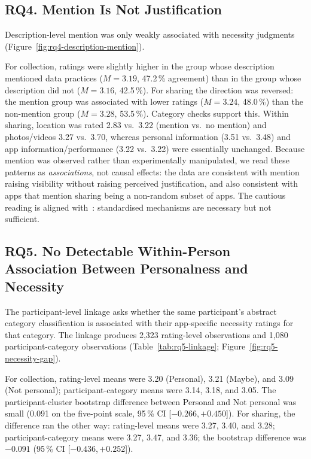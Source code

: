 \documentclass[11pt,a4paper]{article}
\begin{document}
\subsection{RQ4. Mention Is Not Justification}
\label{subsec:rq4-description-mention}

Description-level mention was only weakly associated with necessity
judgments (Figure~\ref{fig:rq4-description-mention}).



\noindent For collection,
ratings were slightly higher in the group whose description mentioned
data practices ($M=3.19$, 47.2\,\% agreement) than in the group whose
description did not ($M=3.16$, 42.5\,\%). For sharing the direction was
reversed: the mention group was associated with lower ratings
($M=3.24$, 48.0\,\%) than the non-mention group ($M=3.28$, 53.5\,\%).
Category checks support this. Within sharing, location was rated 2.83
vs.\ 3.22 (mention vs.\ no mention) and photos/videos 3.27 vs.\ 3.70,
whereas personal information (3.51 vs.\ 3.48) and app
information/performance (3.22 vs.\ 3.22) were essentially unchanged.
Because mention was observed rather than experimentally manipulated,
we read these patterns as \emph{associations}, not causal effects: the
data are consistent with mention raising visibility without raising
perceived justification, and also consistent with apps that mention
sharing being a non-random subset of apps. The cautious reading is
aligned with~\citet{cranor:2012}: standardised mechanisms are
necessary but not sufficient.

\subsection{RQ5. No Detectable Within-Person Association Between Personalness and Necessity}
\label{subsec:rq5-necessity-gap}

The participant-level linkage asks whether the same participant's
abstract category classification is associated with their app-specific
necessity ratings for that category. The linkage produces 2{,}323
rating-level observations and 1{,}080 participant-category observations
(Table~\ref{tab:rq5-linkage}; Figure~\ref{fig:rq5-necessity-gap}).



For collection, rating-level means were 3.20 (Personal), 3.21 (Maybe),
and 3.09 (Not personal); participant-category means were 3.14, 3.18,
and 3.05. The participant-cluster bootstrap difference between Personal
and Not personal was small (0.091 on the five-point scale, 95\,\% CI
[$-0.266$,\,$+0.450$]). For sharing, the difference ran the other way:
rating-level means were 3.27, 3.40, and 3.28; participant-category means
were 3.27, 3.47, and 3.36; the bootstrap difference was $-0.091$
(95\,\% CI [$-0.436$,\,$+0.252$]).
\end{document}
